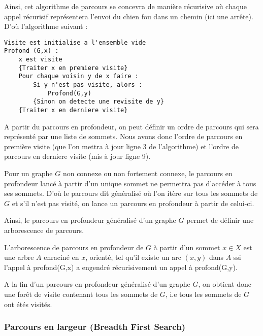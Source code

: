 Ainsi, cet algorithme de parcours se concevra de manière récurisive où chaque appel récurisif représentera l'envoi du chien fou dans un chemin (ici une arrête).
D'où l'algorithme suivant :

\begin{lstlisting}
Visite est initialise a l'ensemble vide 
Profond (G,x) :
    x est visite
    {Traiter x en premiere visite}
    Pour chaque voisin y de x faire :
        Si y n'est pas visite, alors :
            Profond(G,y)
        {Sinon on detecte une revisite de y}
    {Traiter x en derniere visite}
\end{lstlisting}


A partir du parcours en profondeur, on peut définir un ordre de parcours qui sera représenté par une liste de sommets.
Nous avons donc l'ordre de parcours en première visite (que l'on mettra à jour ligne 3 de l'algorithme)
et l'ordre de parcours en derniere visite (mis à jour ligne 9).

Pour un graphe $G$ non connexe ou non fortement connexe, le parcours en profondeur lancé à partir d'un unique sommet ne 
permettra pas d'accéder à tous ses sommets. D'où le parcours dit généralisé où l'on itère sur tous les sommets de $G$ et s'il n'est 
pas visité, on lance un parcours en profondeur à partir de celui-ci.

Ainsi, le parcours en profondeur généralisé d'un graphe $G$ permet de définir une arborescence de parcours.

\begin{definition}
    L'arborescence de parcours en profondeur de $G$ à partir d'un sommet $x \in X$ est une arbre $A$ enraciné en $x$, orienté, tel qu'il existe un arc $(x,y)$ dans $A$ 
    ssi l'appel à profond(G,x) a engendré récurisivement un appel à profond(G,y).
\end{definition}

A la fin d'un parcours en profondeur généralisé d'un graphe $G$, on obtient donc une forêt de visite contenant tous les sommets de $G$, i.e tous les sommets de $G$ ont étés visités.

\subsubsection{Parcours en largeur (Breadth First Search)}

